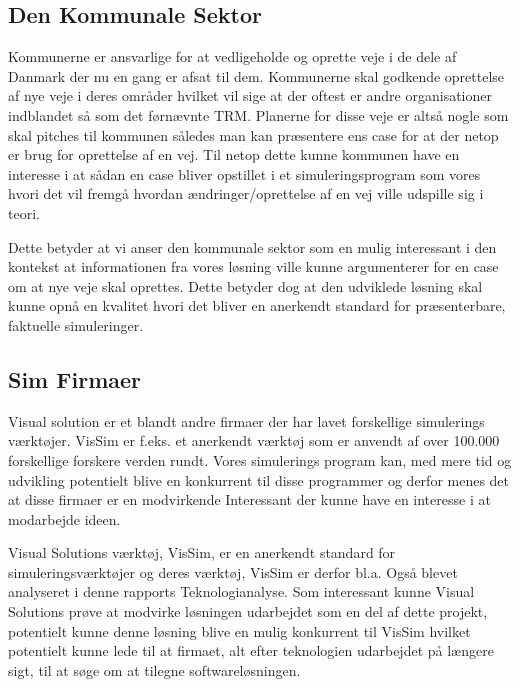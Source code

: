 \subsection {Den Kommunale Sektor}
Kommunerne er ansvarlige for at vedligeholde og oprette veje i de dele af Danmark der nu en gang er afsat til dem. Kommunerne skal godkende oprettelse af nye veje i deres områder hvilket vil sige at der oftest er andre organisationer indblandet så som det førnævnte TRM. Planerne for disse veje er altså nogle som skal pitches til kommunen således man kan præsentere ens case for at der netop er brug for oprettelse af en vej. Til netop dette kunne kommunen have en interesse i at sådan en case bliver opstillet i et simuleringsprogram som vores hvori det vil fremgå hvordan ændringer/oprettelse af en vej ville udspille sig i teori.

\vspace{5mm}

Dette betyder at vi anser den kommunale sektor som en mulig interessant i den kontekst at informationen fra vores løsning ville kunne argumenterer for en case om at nye veje skal oprettes. Dette betyder dog at den udviklede løsning skal kunne opnå en kvalitet hvori det bliver en anerkendt standard for præsenterbare, faktuelle simuleringer.

\subsection{Sim Firmaer}
Visual solution er et blandt andre firmaer der har lavet forskellige simulerings værktøjer. VisSim er f.eks. et anerkendt værktøj som er anvendt af over 100.000 forskellige forskere verden rundt\cite{VisualSolutions}.
Vores simulerings program kan, med mere tid og udvikling potentielt blive en konkurrent til disse programmer og derfor menes det at disse firmaer er en modvirkende Interessant der kunne have en interesse i at modarbejde ideen.

\vspace{5mm}

Visual Solutions værktøj, VisSim, er en anerkendt standard for simuleringsværktøjer og deres værktøj, VisSim er derfor bl.a. Også blevet analyseret i denne rapports Teknologianalyse. Som interessant kunne Visual Solutions prøve at modvirke løsningen udarbejdet som en del af dette projekt, potentielt kunne denne løsning blive en mulig konkurrent til VisSim hvilket potentielt kunne lede til at firmaet, alt efter teknologien udarbejdet på længere sigt, til at søge om at tilegne softwareløsningen.

